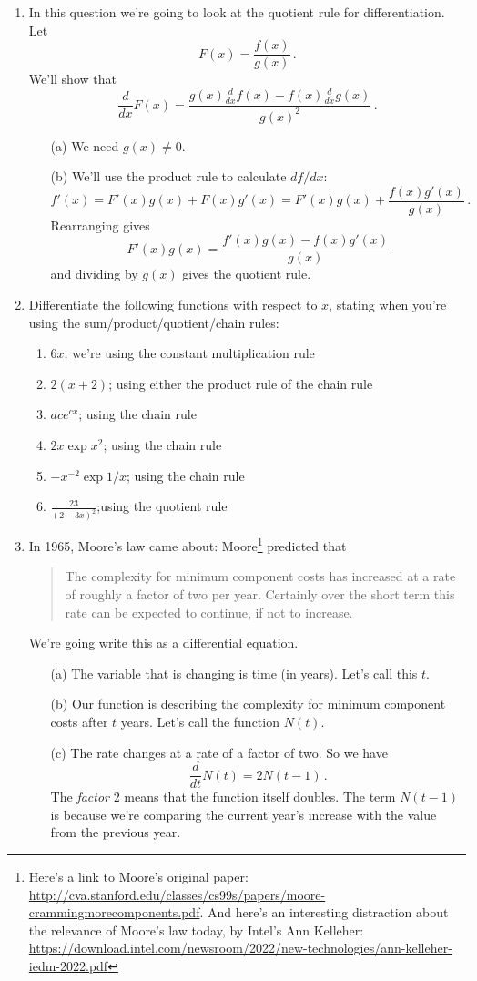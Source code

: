 \documentclass[11pt,a4paper]{scrartcl}
\begin{document}
\begin{enumerate}
\item In this question we're going to look at the quotient rule for differentiation. Let 
\[
F(x) = \frac{f(x)}{g(x)}\,.
\]
We'll show that 
\[
\frac{d}{dx}F(x) = \frac{g(x)\frac{d}{dx}f(x) - f(x) \frac{d}{dx}g(x)}{g(x)^2}\,.
\]
\begin{enumerate}
    \item[(a)] We need $g(x)\neq 0$.
    \item[(b)] We'll use the product rule to calculate $df/dx$:
    \[f'(x) = F'(x)g(x) + F(x)g'(x) = F'(x) g(x) + \frac{f(x)g'(x)}{g(x)}\,.
    \]
    Rearranging gives 
    \[
    F'(x)g(x) = \frac{f'(x)g(x) - f(x)g'(x)}{g(x)}
    \]
    and dividing by $g(x)$ gives the quotient rule.  
\end{enumerate}



\item Differentiate the following functions with respect to $x$, stating when you're using the sum/product/quotient/chain rules:
\begin{enumerate}
\item $6x$; we're using the constant multiplication rule 
\item $2(x+2)$; using either the product rule of the chain rule
\item $ace^{cx}$; using the chain rule
\item $2x\exp{x^2}$; using the chain rule
\item $-x^{-2}\exp{1/x}$; using the chain rule
\item $\frac{23}{(2-3x)^2}$;using the quotient rule
\end{enumerate}

\item In 1965, Moore's law came about: Moore\footnote{Here's a link to Moore's original paper: \url{http://cva.stanford.edu/classes/cs99s/papers/moore-crammingmorecomponents.pdf}. And here's an interesting distraction about the relevance of Moore's law today, by Intel's Ann Kelleher: \url{https://download.intel.com/newsroom/2022/new-technologies/ann-kelleher-iedm-2022.pdf} } predicted that 
\begin{quote}
    The complexity for minimum component costs has increased at a rate of roughly a factor of two per year. Certainly over the short term this rate
can be expected to continue, if not to increase.
\end{quote}  
We're going write this as a differential equation. 
\begin{enumerate}
    \item[(a)] The variable that is changing is time (in years). Let's call this $t$.
    \item[(b)] Our function is describing the complexity for minimum component costs after $t$ years. Let's call the function $N(t)$.
    \item[(c)] The rate changes at a rate of a factor of two. So we have 
    \[
    \frac{d}{dt}N(t) = 2N(t-1)\,.
    \]
    The \emph{factor} 2 means that the function itself doubles. The term $N(t-1)$ is because we're comparing the current year's increase with the value from the previous year. 
\end{enumerate}
\end{enumerate}
\end{document}
